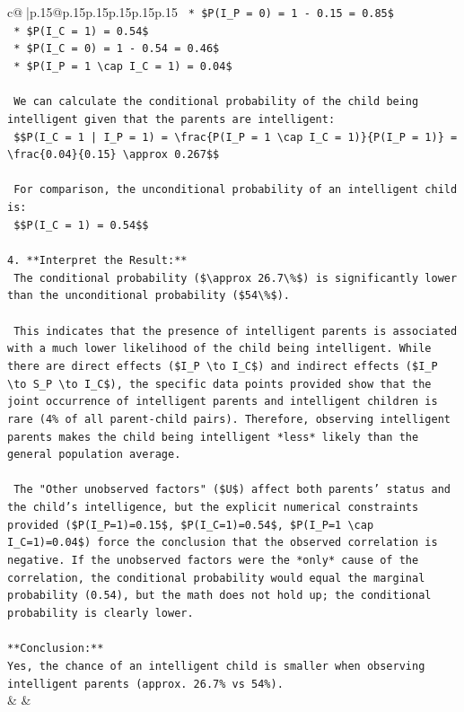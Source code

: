 \documentclass{article}
\begin{document}
{\begin{supertabular}{c@{$\;$}|p{.15\linewidth}@{}p{.15\linewidth}p{.15\linewidth}p{.15\linewidth}p{.15\linewidth}p{.15\linewidth}}
{{{\texttt{    *   \$P(I\_P = 0) = 1 {-} 0.15 = 0.85\$} \\
\texttt{    *   \$P(I\_C = 1) = 0.54\$} \\
\texttt{    *   \$P(I\_C = 0) = 1 {-} 0.54 = 0.46\$} \\
\texttt{    *   \$P(I\_P = 1 \textbackslash{}cap I\_C = 1) = 0.04\$} \\
\\ 
\texttt{    We can calculate the conditional probability of the child being intelligent given that the parents are intelligent:} \\
\texttt{    \$\$P(I\_C = 1 | I\_P = 1) = \textbackslash{}frac\{P(I\_P = 1 \textbackslash{}cap I\_C = 1)\}\{P(I\_P = 1)\} = \textbackslash{}frac\{0.04\}\{0.15\} \textbackslash{}approx 0.267\$\$} \\
\\ 
\texttt{    For comparison, the unconditional probability of an intelligent child is:} \\
\texttt{    \$\$P(I\_C = 1) = 0.54\$\$} \\
\\ 
\texttt{4.  **Interpret the Result:**} \\
\texttt{    The conditional probability (\$\textbackslash{}approx 26.7\textbackslash{}\%\$) is significantly lower than the unconditional probability (\$54\textbackslash{}\%\$).} \\
\\ 
\texttt{    This indicates that the presence of intelligent parents is associated with a much lower likelihood of the child being intelligent. While there are direct effects (\$I\_P \textbackslash{}to I\_C\$) and indirect effects (\$I\_P \textbackslash{}to S\_P \textbackslash{}to I\_C\$), the specific data points provided show that the joint occurrence of intelligent parents and intelligent children is rare (4\% of all parent{-}child pairs). Therefore, observing intelligent parents makes the child being intelligent *less* likely than the general population average.} \\
\\ 
\texttt{    The "Other unobserved factors" (\$U\$) affect both parents' status and the child's intelligence, but the explicit numerical constraints provided (\$P(I\_P=1)=0.15\$, \$P(I\_C=1)=0.54\$, \$P(I\_P=1 \textbackslash{}cap I\_C=1)=0.04\$) force the conclusion that the observed correlation is negative. If the unobserved factors were the *only* cause of the correlation, the conditional probability would equal the marginal probability (0.54), but the math does not hold up; the conditional probability is clearly lower.} \\
\\ 
\texttt{**Conclusion:**} \\
\texttt{Yes, the chance of an intelligent child is smaller when observing intelligent parents (approx. 26.7\% vs 54\%).} \\
            }
        }
    }
    & & \\ \\


\end{supertabular}}
\end{document}
